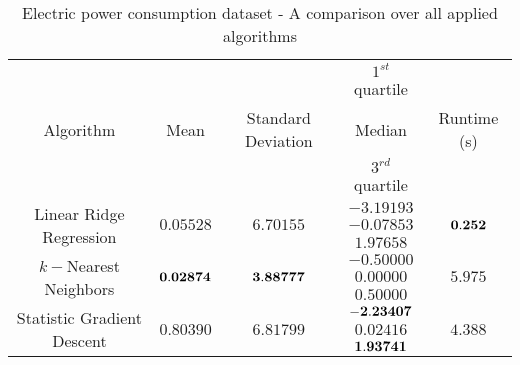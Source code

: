 \begin{table}[p]
\begin{center} 
\begin{tabular}{|c|c|c|c|c|}
			\hline \multirow{3}{*}{Algorithm} &&& $1^{st}$ quartile
			&\\&Mean&Standard Deviation&Median& Runtime (s)\\&&& $3^{rd}$ quartile &\\
			\hline \multirow{3}{*}{Linear Ridge
Regression}&&&$-3.19193$&\\
			& $0.05528$ & $6.70155$  & $-0.07853$ & $\bf {0.252}$\\
			 ($\alpha = 0.1$)&&&$1.97658$& \\
			\hline \multirow{3}{*}{$k-$Nearest Neighbors}&&&$-0.50000$&\\
			& $\bf {0.02874}$ & $\bf {3.88777}$  & $0.00000$ & $5.975$\\
			 ($k = 2$)&&&$0.50000$& \\
			\hline \multirow{3}{*}{Statistic Gradient Descent }&&&$\bf {-2.23407}$&\\
			& $0.80390$ & $6.81799$  & $0.02416$ & $4.388$\\
			({\it huber}, $\epsilon = 0.1$ )&&&$\bf {1.93741}$& \\
			\hline

		\end{tabular}
	\end{center}
\caption{Electric power consumption dataset - A comparison over all applied
algorithms\label{ypmsd:table:ds3comparison}}

\end{table}
